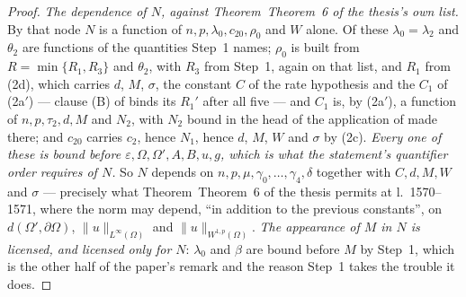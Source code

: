 \begin{proof}
\emph{The dependence of $N$, against Theorem~Theorem~6 of the thesis's own list.}  By that
node $N$ is a function of $n,p,\lambda_0,c_{20},\rho_0$ and $W$ alone.  Of
these $\lambda_0=\lambda_2$ and $\theta_2$ are functions of the quantities
Step~1 names; $\rho_0$ is built from $R=\min\{R_1,R_3\}$ and $\theta_2$, with
$R_3$ from Step~1, again on that list, and $R_1$ from (2d), which carries $d$,
$M$, $\sigma$, the constant $C$ of the rate hypothesis and the $C_1$ of
(2a$'$) --- clause (B) of  binds its
$R_1'$ after all five --- and $C_1$ is, by (2a$'$), a function of
$n,p,\tau_2,d,M$ and $N_2$, with $N_2$ bound in the head of the application of
 made there; and $c_{20}$ carries $c_2$,
hence $N_1$, hence $d$, $M$, $W$ and $\sigma$ by (2c).  \emph{Every one of
these is bound before $\varepsilon,\Omega,\Omega',A,B,u,g$, which is what the
statement's quantifier order requires of $N$.}  So $N$ depends on
$n,p,\mu,\gamma_0,\dots,\gamma_4,\delta$ together with $C,d,M,W$ and $\sigma$
--- precisely what Theorem~Theorem~6 of the thesis permits at l.~1570--1571, where the norm
may depend, ``in addition to the previous constants'', on
$d(\Omega',\partial\Omega)$, $\|u\|_{L^\infty(\Omega)}$ and
$\|u\|_{W^{1,p}(\Omega)}$.  \emph{The appearance of $M$ in $N$ is licensed, and
licensed only for $N$}: $\lambda_0$ and $\beta$ are bound before $M$ by
Step~1, which is the other half of the paper's remark and the reason Step~1
takes the trouble it does.


\end{proof}
